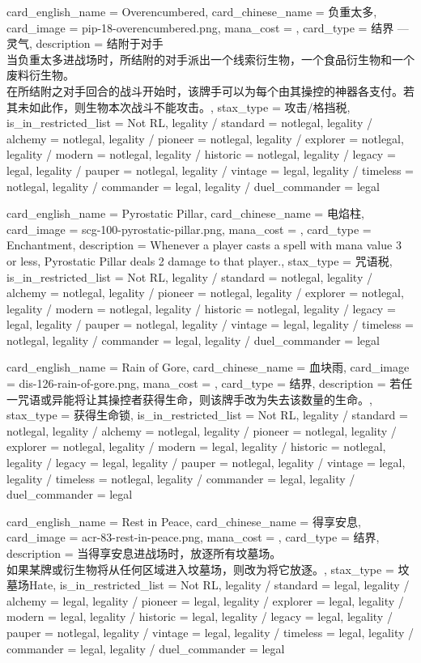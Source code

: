 \documentclass[lang = cn, color = black, 10pt]{AllThatStax}
\begin{document}
\card
{
	card_english_name = {Overencumbered},
	card_chinese_name = {负重太多},
	card_image = pip-18-overencumbered.png,
	mana_cost = ,
	card_type = 结界 — 灵气,
	description = {结附于对手\\
		当负重太多进战场时，所结附的对手派出一个线索衍生物，一个食品衍生物和一个废料衍生物。\\
		在所结附之对手回合的战斗开始时，该牌手可以为每个由其操控的神器各支付。若其未如此作，则生物本次战斗不能攻击。},
	stax_type = 攻击/格挡税,
	is_in_restricted_list = Not RL,
	legality / standard = notlegal,
	legality / alchemy = notlegal,
	legality / pioneer = notlegal,
	legality / explorer = notlegal,
	legality / modern = notlegal,
	legality / historic = notlegal,
	legality / legacy = legal,
	legality / pauper = notlegal,
	legality / vintage = legal,
	legality / timeless = notlegal,
	legality / commander = legal,
	legality / duel_commander = legal
}

\card
{
	card_english_name = {Pyrostatic Pillar},
	card_chinese_name = {电焰柱},
	card_image = scg-100-pyrostatic-pillar.png,
	mana_cost = ,
	card_type = Enchantment,
	description = {Whenever a player casts a spell with mana value 3 or less, Pyrostatic Pillar deals 2 damage to that player.},
	stax_type = 咒语税,
	is_in_restricted_list = Not RL,
	legality / standard = notlegal,
	legality / alchemy = notlegal,
	legality / pioneer = notlegal,
	legality / explorer = notlegal,
	legality / modern = notlegal,
	legality / historic = notlegal,
	legality / legacy = legal,
	legality / pauper = notlegal,
	legality / vintage = legal,
	legality / timeless = notlegal,
	legality / commander = legal,
	legality / duel_commander = legal
}

\card
{
	card_english_name = {Rain of Gore},
	card_chinese_name = {血块雨},
	card_image = dis-126-rain-of-gore.png,
	mana_cost = ,
	card_type = 结界,
	description = {若任一咒语或异能将让其操控者获得生命，则该牌手改为失去该数量的生命。},
	stax_type = 获得生命锁,
	is_in_restricted_list = Not RL,
	legality / standard = notlegal,
	legality / alchemy = notlegal,
	legality / pioneer = notlegal,
	legality / explorer = notlegal,
	legality / modern = legal,
	legality / historic = notlegal,
	legality / legacy = legal,
	legality / pauper = notlegal,
	legality / vintage = legal,
	legality / timeless = notlegal,
	legality / commander = legal,
	legality / duel_commander = legal
}

\card
{
	card_english_name = {Rest in Peace},
	card_chinese_name = {得享安息},
	card_image = acr-83-rest-in-peace.png,
	mana_cost = ,
	card_type = 结界,
	description = {当得享安息进战场时，放逐所有坟墓场。\\
		如果某牌或衍生物将从任何区域进入坟墓场，则改为将它放逐。},
	stax_type = 坟墓场Hate,
	is_in_restricted_list = Not RL,
	legality / standard = legal,
	legality / alchemy = legal,
	legality / pioneer = legal,
	legality / explorer = legal,
	legality / modern = legal,
	legality / historic = legal,
	legality / legacy = legal,
	legality / pauper = notlegal,
	legality / vintage = legal,
	legality / timeless = legal,
	legality / commander = legal,
	legality / duel_commander = legal
}
\end{document}
